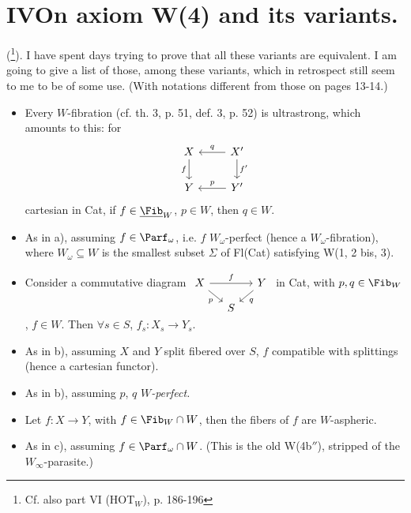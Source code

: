 

\section*{IV\quad On axiom W(4) and its variants.}

(\footnote[60]{Cf. also part VI (HOT$_W$), p. 186-196}). I have spent days trying to prove that all these variants are equivalent. I am going to give a list of those, among these variants, which in retrospect still seem to me to be of some use. (With notations different from those on pages 13-14.)

\begin{itemize}[leftmargin=5em,labelsep=0.5em]
\item[\fbox{W(4a)}] Every $W$-fibration (cf. th. 3, p. 51, def. 3, p. 52) is ultrastrong, which amounts to this: for
\[
\begin{tikzcd}
X & X' \arrow[l,"q"'] \arrow[d,"f'"] \\
Y \arrow[from=u,"f"'] & Y' \arrow[l,"p"']
\end{tikzcd}
\]
cartesian in Cat, if $f \in \underline{\Fib}_W$, $p \in W$, then $q \in W$.

\item[W(4a$'$)] As in a), assuming $f \in \Parf_\omega$, i.e. $f$ $W_\omega$-perfect (hence a $W_\omega$-fibration), where $W_\omega \subseteq W$ is the smallest subset $\Sigma$ of Fl(Cat) satisfying W(1, 2 bis, 3). %

\item[\fbox{W(4b)}] Consider a commutative diagram
$\begin{tikzcd}[ampersand replacement=\&, column sep=small, row sep=small, baseline=(X.base)]
|[alias=X]| X \arrow[rr,"f"] \arrow[dr,"p"'] \& \& Y \arrow[dl,"q"] \\
\& S \&
\end{tikzcd}$
in Cat, with $p, q \in \Fib_W$, $f \in W$.
Then $\forall s \in S$, $f_s : X_s \longrightarrow Y_s$.

\item[W(4b$'$)] As in b), assuming $X$ and $Y$ split fibered over $S$, $f$ compatible with splittings (hence a cartesian functor).

\item[W(4b$''$)] As in b), assuming $p$, $q$ $W$\textit{-perfect.}

\item[\fbox{W(4c)}] Let $f : X \longrightarrow Y$, with $f \in \Fib_W \cap W$, then the fibers of $f$ are $W$-aspheric.

\item[\dashedbox{W(4c$'$)}] As in c), assuming $f \in \Parf_\omega \cap W$. (This is the old W(4b$''$), stripped of the $W_\infty$-parasite.)
\end{itemize}

